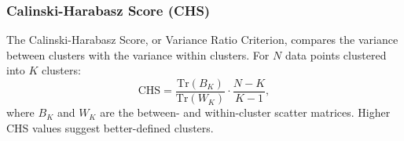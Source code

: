 \subsubsection{Calinski-Harabasz Score (CHS)}
The Calinski-Harabasz Score, or Variance Ratio Criterion, compares the variance between clusters with the variance within clusters. For $N$ data points clustered into $K$ clusters:
\[
\text{CHS} = \frac{\text{Tr}(B_K)}{\text{Tr}(W_K)} \cdot \frac{N - K}{K - 1},
\]
where $B_K$ and $W_K$ are the between- and within-cluster scatter matrices. Higher CHS values suggest better-defined clusters.